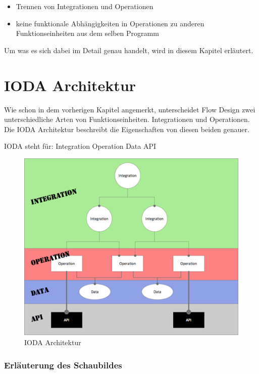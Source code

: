 \begin{itemize}
\item Trennen von Integrationen und Operationen
\item keine funktionale Abhängigkeiten in Operationen zu anderen Funktionseinheiten aus dem selben Programm
\end{itemize}

Um was es sich dabei im Detail genau handelt, wird in diesem Kapitel erläutert.

\pagebreak
\section{IODA Architektur}


Wie schon in dem vorherigen Kapitel angemerkt, unterscheidet Flow Design zwei
unterschiedliche Arten von Funktionseinheiten. Integrationen und Operationen.
Die IODA Architektur beschreibt die Eigenschaften von diesen beiden genauer.

IODA steht für: Integration Operation Data API


\begin{figure}[H]
	\centering
	\includegraphics[width=.9\linewidth]{./img/ioda1.png}
	\caption{IODA Architektur}
\end{figure}



\let\thefootnote\relax{}
\subsubsection{Erläuterung des Schaubildes}

